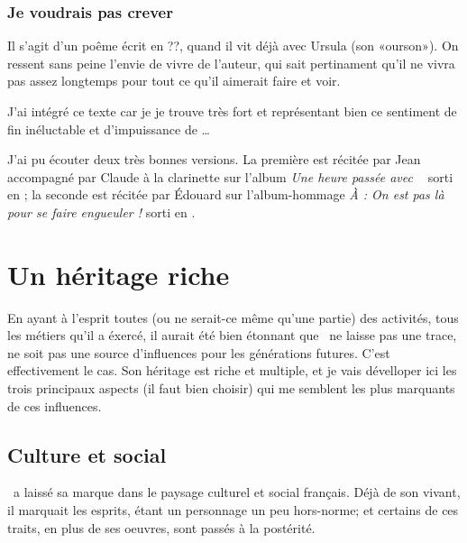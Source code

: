 \subsubsection{Je voudrais pas crever}
Il s'agit d'un poême écrit en ??, quand il vit déjà avec Ursula
(son «ourson»). On ressent sans peine l'envie de vivre de
l'auteur, qui sait pertinament qu'il ne vivra pas assez longtemps pour
tout ce qu'il aimerait faire et voir.

\begin{multicols}{2}
{\footnotesize
\settowidth{\versewidth}{Où valsent les brins d'algues}
\begin{verse}

\end{verse}
}
\end{multicols}

J'ai intégré ce texte car je je trouve très fort et représentant bien ce sentiment de fin inéluctable et d'impuissance de \BV\ldots

J'ai pu écouter
deux très bonnes versions. La première est récitée par Jean  accompagné
par Claude  à la clarinette sur l'album \emph{Une heure passée avec \BV\ }
sorti en ; la seconde est récitée par Édouard  sur
l'album-hommage \emph{À \BV: On est pas là pour se faire engueuler !} sorti en .

\section{Un héritage riche}

En ayant à l'esprit toutes (ou ne serait-ce même qu'une partie) des activités,
tous les métiers qu'il a éxercé, il aurait été bien étonnant que \BV\ ne
laisse pas une trace, ne soit pas une source d'influences pour les générations
futures.
C'est effectivement le cas. Son héritage est riche et multiple, et je vais
dévelloper ici les trois principaux aspects (il faut bien choisir) qui me semblent
les plus marquants de ces influences.

\subsection{Culture et social}

\BV\ a laissé sa marque dans le paysage culturel et social français. Déjà
de son vivant, il marquait les esprits, étant un personnage un peu hors-norme; et
certains de ces traits, en plus de ses oeuvres, sont passés à la postérité.


